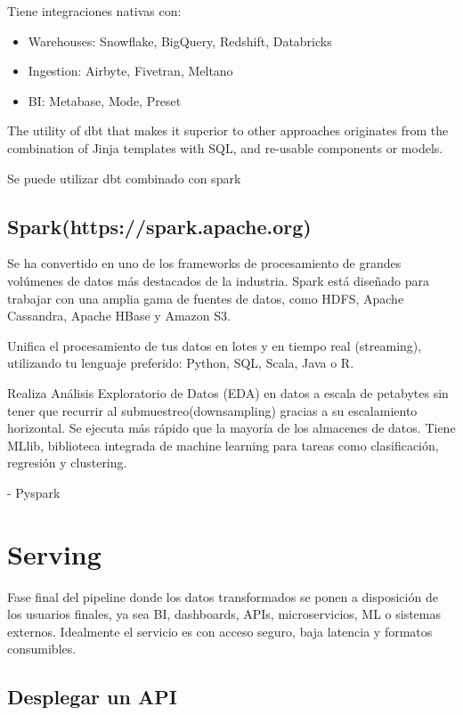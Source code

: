 \documentclass[12pt]{book}
\begin{document}
Tiene integraciones nativas con:
\begin{itemize}
    \item Warehouses: Snowflake, BigQuery, Redshift, Databricks
    \item Ingestion: Airbyte, Fivetran, Meltano
    \item BI: Metabase, Mode, Preset
\end{itemize}

The utility of dbt that makes it superior to other approaches originates from the combination of Jinja templates with SQL, and re-usable components or models.

Se puede utilizar dbt combinado con spark
\subsection{Spark(https://spark.apache.org)}
Se ha convertido en uno de los frameworks de procesamiento de grandes volúmenes de 
datos más destacados de la industria. Spark está diseñado para trabajar con una amplia 
gama de fuentes de datos, como HDFS, Apache Cassandra, Apache HBase y Amazon S3.

Unifica el procesamiento de tus datos en lotes y en tiempo real (streaming), utilizando 
tu lenguaje preferido: Python, SQL, Scala, Java o R.

Realiza Análisis Exploratorio de Datos (EDA) en datos a escala de petabytes sin 
tener que recurrir al submuestreo(downsampling) gracias a su escalamiento 
horizontal. Se ejecuta más rápido que la mayoría de los almacenes de datos.
Tiene MLlib, biblioteca integrada de machine learning para tareas como 
clasificación, regresión y clustering.

- Pyspark

\section{Serving}
Fase final del pipeline donde los datos transformados se ponen a disposición de los usuarios 
finales, ya sea BI, dashboards, APIs, microservicios, ML o sistemas externos. Idealmente el 
servicio es con acceso seguro, baja latencia y formatos consumibles.

\subsection{Desplegar un API}
\end{document}
